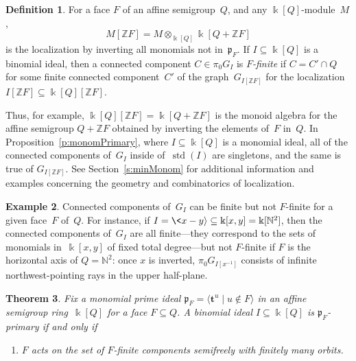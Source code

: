 \documentclass[12pt]{amsart}
\numberwithin{equation}{section}
\newtheorem{thm}{Theorem}[section]
\theoremstyle{definition}
\newtheorem{defn}[thm]{Definition}
\newtheorem{example}[thm]{Example}
\begin{document}
\begin{defn}\label{d:localize}
For a face $F$ of an affine semigroup~$Q$, and any
${\Bbbk}[Q]$-module~$M$,
$$  M[{\mathbb{Z}} F] = M \otimes_{{\Bbbk}[Q]} {\Bbbk}[Q + {\mathbb{Z}} F]
$$
is the localization
by inverting all monomials not in~${\mathfrak{p}}_F$.  If $I \subseteq {\Bbbk}[Q]$ is
a binomial ideal, then a connected component $C \in \pi_0 G_I$ is
\emph{$F$-finite} if $C = C' \cap Q$ for some finite connected
component~$C'$ of the graph~$G_{I[{\mathbb{Z}} F]}$ for the localization $I[{\mathbb{Z}}
F] \subseteq {\Bbbk}[Q][{\mathbb{Z}} F]$.
\end{defn}

Thus, for example, ${\Bbbk}[Q][{\mathbb{Z}} F] = {\Bbbk}[Q + {\mathbb{Z}} F]$ is the monoid
algebra for the affine semigroup $Q + {\mathbb{Z}} F$ obtained by inverting the
elements of~$F$ in~$Q$.  In Proposition~\ref{p:monomPrimary}, where $I
\subseteq {\Bbbk}[Q]$ is a monomial ideal, all of the connected components
of~$G_I$ inside of~$\operatorname{std}(I)$ are singletons, and the same is true of
$G_{I[{\mathbb{Z}} F]}$.  See Section~\ref{s:minMonom} for additional
information and examples concerning the geometry and combinatorics of
localization.

\begin{example}\label{e:finite}
Connected components of~$G_I$ can be finite but not $F$-finite for a
given face~$F$ of~$Q$.  For instance, if $I = \<x - y{\rangle} \subseteq
{\Bbbk}[x,y] = {\Bbbk}[{\mathbb{N}}^2]$, then the connected components of~$G_I$ are all
finite---they correspond to the sets of monomials in~${\Bbbk}[x,y]$ of
fixed total degree---but not $F$-finite if $F$ is the horizontal axis
of $Q = {\mathbb{N}}^2$: once $x$ is inverted, $\pi_0 G_{I[x^{-1}]}$ consists
of infinite northwest-pointing rays in the upper half-plane.
\end{example}

\begin{thm}\label{t:monPrimary}
Fix a monomial prime ideal ${\mathfrak{p}}_F = {\langle}{\mathbf{t}}^u \mid u \notin F{\rangle}$ in an
affine semigroup ring~${\Bbbk}[Q]$ for a face $F \subseteq Q$.  A binomial
ideal $I \subseteq {\Bbbk}[Q]$ is ${\mathfrak{p}}_F$-primary if and only if
\begin{enumerate}
\itemEvery connected component of\/~$G_I$ other than $\{u \in Q \mid {\mathbf{t}}^u
\in I\}$ is $F$-finite.
\item$F$ acts on the set of $F$-finite components semifreely with finitely
many orbits.
\end{enumerate}
\end{thm}
\end{document}
